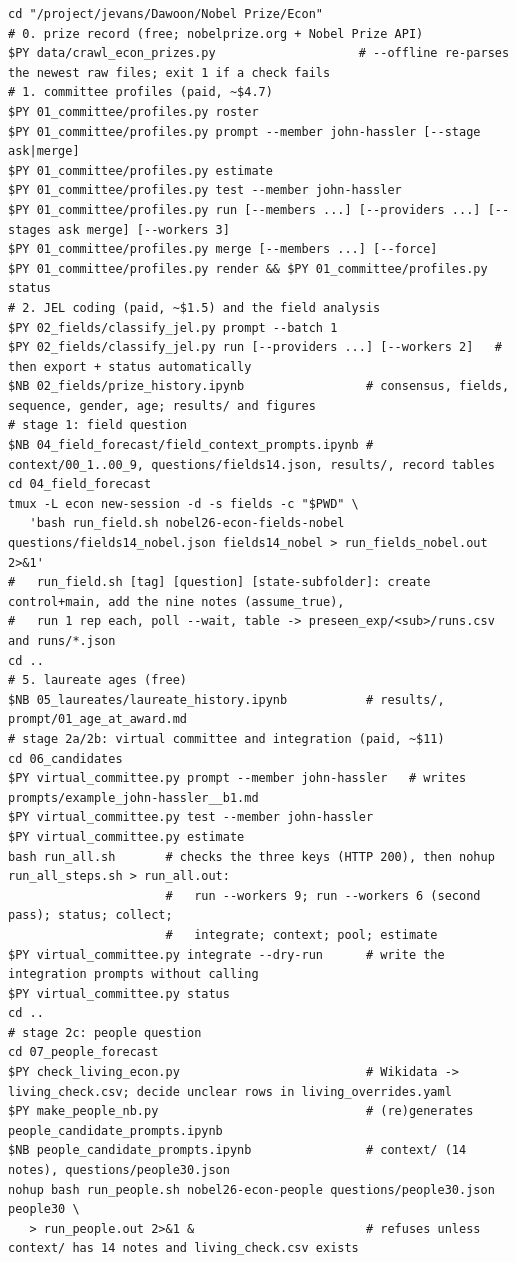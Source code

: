 \documentclass[11pt,a4paper]{article}
\begin{document}
\begin{Verbatim}
cd "/project/jevans/Dawoon/Nobel Prize/Econ"
# 0. prize record (free; nobelprize.org + Nobel Prize API)
$PY data/crawl_econ_prizes.py                    # --offline re-parses the newest raw files; exit 1 if a check fails
# 1. committee profiles (paid, ~$4.7)
$PY 01_committee/profiles.py roster
$PY 01_committee/profiles.py prompt --member john-hassler [--stage ask|merge]
$PY 01_committee/profiles.py estimate
$PY 01_committee/profiles.py test --member john-hassler
$PY 01_committee/profiles.py run [--members ...] [--providers ...] [--stages ask merge] [--workers 3]
$PY 01_committee/profiles.py merge [--members ...] [--force]
$PY 01_committee/profiles.py render && $PY 01_committee/profiles.py status
# 2. JEL coding (paid, ~$1.5) and the field analysis
$PY 02_fields/classify_jel.py prompt --batch 1
$PY 02_fields/classify_jel.py run [--providers ...] [--workers 2]   # then export + status automatically
$NB 02_fields/prize_history.ipynb                 # consensus, fields, sequence, gender, age; results/ and figures
# stage 1: field question
$NB 04_field_forecast/field_context_prompts.ipynb # context/00_1..00_9, questions/fields14.json, results/, record tables
cd 04_field_forecast
tmux -L econ new-session -d -s fields -c "$PWD" \
   'bash run_field.sh nobel26-econ-fields-nobel questions/fields14_nobel.json fields14_nobel > run_fields_nobel.out 2>&1'
#   run_field.sh [tag] [question] [state-subfolder]: create control+main, add the nine notes (assume_true),
#   run 1 rep each, poll --wait, table -> preseen_exp/<sub>/runs.csv and runs/*.json
cd ..
# 5. laureate ages (free)
$NB 05_laureates/laureate_history.ipynb           # results/, prompt/01_age_at_award.md
# stage 2a/2b: virtual committee and integration (paid, ~$11)
cd 06_candidates
$PY virtual_committee.py prompt --member john-hassler   # writes prompts/example_john-hassler__b1.md
$PY virtual_committee.py test --member john-hassler
$PY virtual_committee.py estimate
bash run_all.sh       # checks the three keys (HTTP 200), then nohup run_all_steps.sh > run_all.out:
                      #   run --workers 9; run --workers 6 (second pass); status; collect;
                      #   integrate; context; pool; estimate
$PY virtual_committee.py integrate --dry-run      # write the integration prompts without calling
$PY virtual_committee.py status
cd ..
# stage 2c: people question
cd 07_people_forecast
$PY check_living_econ.py                          # Wikidata -> living_check.csv; decide unclear rows in living_overrides.yaml
$PY make_people_nb.py                             # (re)generates people_candidate_prompts.ipynb
$NB people_candidate_prompts.ipynb                # context/ (14 notes), questions/people30.json
nohup bash run_people.sh nobel26-econ-people questions/people30.json people30 \
   > run_people.out 2>&1 &                        # refuses unless context/ has 14 notes and living_check.csv exists
\end{Verbatim}
\end{document}

